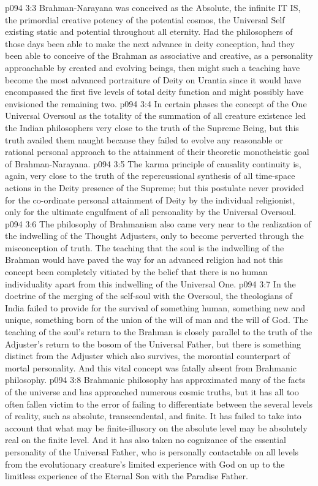 \vs p094 3:3 Brahman\hyp{}Narayana was conceived as the Absolute, the infinite IT IS, the primordial creative potency of the potential cosmos, the Universal Self existing static and potential throughout all eternity. Had the philosophers of those days been able to make the next advance in deity conception, had they been able to conceive of the Brahman as associative and creative, as a personality approachable by created and evolving beings, then might such a teaching have become the most advanced portraiture of Deity on Urantia since it would have encompassed the first five levels of total deity function and might possibly have envisioned the remaining two.
\vs p094 3:4 In certain phases the concept of the One Universal Oversoul as the totality of the summation of all creature existence led the Indian philosophers very close to the truth of the Supreme Being, but this truth availed them naught because they failed to evolve any reasonable or rational personal approach to the attainment of their theoretic monotheistic goal of Brahman\hyp{}Narayana.
\vs p094 3:5 The karma principle of causality continuity is, again, very close to the truth of the repercussional synthesis of all time\hyp{}space actions in the Deity presence of the Supreme; but this postulate never provided for the co\hyp{}ordinate personal attainment of Deity by the individual religionist, only for the ultimate engulfment of all personality by the Universal Oversoul.
\vs p094 3:6 The philosophy of Brahmanism also came very near to the realization of the indwelling of the Thought Adjusters, only to become perverted through the misconception of truth. The teaching that the soul is the indwelling of the Brahman would have paved the way for an advanced religion had not this concept been completely vitiated by the belief that there is no human individuality apart from this indwelling of the Universal One.
\vs p094 3:7 In the doctrine of the merging of the self\hyp{}soul with the Oversoul, the theologians of India failed to provide for the survival of something human, something new and unique, something born of the union of the will of man and the will of God. The teaching of the soul’s return to the Brahman is closely parallel to the truth of the Adjuster’s return to the bosom of the Universal Father, but there is something distinct from the Adjuster which also survives, the morontial counterpart of mortal personality. And this vital concept was fatally absent from Brahmanic philosophy.
\vs p094 3:8 Brahmanic philosophy has approximated many of the facts of the universe and has approached numerous cosmic truths, but it has all too often fallen victim to the error of failing to differentiate between the several levels of reality, such as absolute, transcendental, and finite. It has failed to take into account that what may be finite\hyp{}illusory on the absolute level may be absolutely real on the finite level. And it has also taken no cognizance of the essential personality of the Universal Father, who is personally contactable on all levels from the evolutionary creature’s limited experience with God on up to the limitless experience of the Eternal Son with the Paradise Father.\plusone
